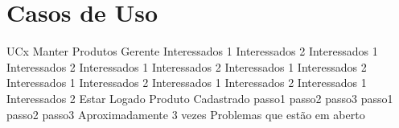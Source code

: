 \chapter{Casos de Uso}
\casoDeUso
{UCx}
{Manter Produtos}
{Gerente}
{
Interessados 1 Interessados 2
Interessados 1 Interessados 2
Interessados 1 Interessados 2
Interessados 1 Interessados 2
Interessados 1 Interessados 2
Interessados 1 Interessados 2
Interessados 1 Interessados 2
}
{Estar Logado}
{Produto Cadastrado}
{
passo1
passo2
passo3
}
{
passo1
passo2
passo3
}
{Aproximadamente 3 vezes}
{
Problemas que estão em aberto
}


